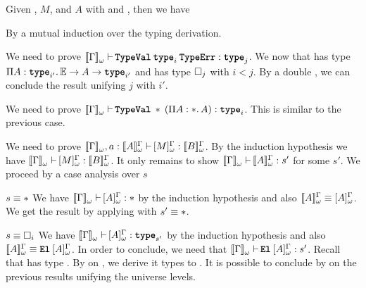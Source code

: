 \begin{Theorem}
Given \Context, $M$, and $A$ with \wfContext{\Context} and , then we have
\end{Theorem}

\begin{Proof}
By a mutual induction over the typing derivation.
\begin{ProofCase}{\CicType}
We need to prove 
$\ctyping[][\WContextTrans{\Context}]{
          \app{\TypeVal}{\type}{\TypeErr}}{
          \type[j]}$. 
We now that \TypeVal{} has type 
$\depArrow{A}{\type[i']}{\arrow{\arrow{\ExceptionType}{A}}{\type[i']}}$ and \type{} has type 
$\Type[j]$ with $i<j$. By a double \CicApp{}, we can conclude the result unifying $j$ with $i'$.
\end{ProofCase}

\begin{ProofCase}{\CicProp}
We need to prove 
$\ctyping[][\WContextTrans{\Context}]{
          \app{\TypeVal}{\Prop}{(\depArrow{A}{\Prop}{A})}}{
          \type}$. 
This is similar to the previous case.
\end{ProofCase}

\begin{ProofCase}{\CicWeak}
We need to prove 
$\ctyping[\typing{a}{\WTypeTrans{A}}][\WContextTrans{\Context}]{
          \WTrans{M}}{
          \WTypeTrans{B}}$. 
By the induction hypothesis we have $\ctyping[][\WContextTrans{\Context}]{
          \WTrans{M}}{
          \WTypeTrans{B}}$. It only remains to show
$\ctyping[][\WContextTrans{\Context}]{\WTypeTrans{A}}{s'}$ for some $s'$. We proceed by 
a case analysis over $s$
\begin{SubProofCase}{$s \equiv \ast{}$}
We have $\ctyping[][\WContextTrans{\Context}]{\WTrans{A}}{\Prop}$ by the induction hypothesis
and also $\WTypeTrans{A}\equiv\WTrans{A}$. We get the result by applying \CicWeak{} with 
$s'\equiv\ast$.
\end{SubProofCase}

\begin{SubProofCase}{$s \equiv \Type$}
We have $\ctyping[][\WContextTrans{\Context}]{\WTrans{A}}{\type[s']}$ by the induction hypothesis
and also $\WTypeTrans{A}\equiv\app{\El}{\WTrans{A}}$. In order to conclude, we need that 
$\ctyping[][\WContextTrans{\Context}]{\app{\El}{\WTrans{A}}}{s'}$. Recall that
\El{} has type \arrow{\type}{\Type}. By \CicApp{} on , we derive it 
types to \Type[s']. It is possible to conclude by \CicWeak{} on the previous results unifying
the universe levels.
\end{SubProofCase}
\end{ProofCase}


\end{Proof}
